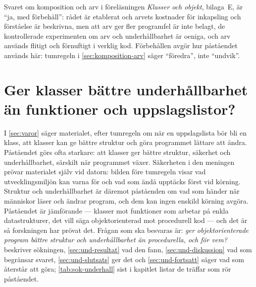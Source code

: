 Svaret om komposition och arv i föreläsningen \emph{Klasser och
objekt}, bilaga~E, är \enquote{ja, med förbehåll}: rådet är etablerat
och arvets kostnader för inkapsling och förståelse är beskrivna, men
att arv ger fler programfel är inte belagt, de kontrollerade
experimenten om arv och underhållbarhet är oeniga, och arv används
flitigt och
förnuftigt i verklig kod.  Förbehållen avgör hur påståendet används
här: tumregeln i \cref{sec:komposition-arv} säger \enquote{föredra},
inte \enquote{undvik}.

\begingroup
\ifdefined\marginnotebesidefloats{}\fi
\marginheightadjustment=48pt
\renewcommand{\foottextfont}{\scriptsize\mpjustification}
\chapter{Ger klasser bättre underhållbarhet än funktioner och uppslagslistor?}
\label{app:underhall}

I \cref{sec:varor} säger materialet, efter tumregeln om när en
uppslagslista bör bli en klass, att klasser kan ge bättre struktur och
göra programmet lättare att ändra.  Påståendet görs ofta starkare: att
klasser ger bättre struktur, säkerhet och underhållbarhet, särskilt när
programmet växer.  Säkerheten i den meningen prövar materialet själv
vid datorn: bilden före tumregeln visar vad utvecklingsmiljön kan varna
för och vad som ändå upptäcks först vid körning.  Struktur och
underhållbarhet är
däremot påståenden om vad som händer när människor läser och ändrar
program, och dem kan ingen enskild körning avgöra.  Påståendet är
jämförande --- klasser mot funktioner som arbetar på enkla
datastrukturer, det vill säga objektorienterad mot procedurell kod ---
och det är så forskningen har prövat det.  Frågan som ska besvaras är:
\emph{ger objektorienterade program bättre struktur och underhållbarhet
än procedurella, och för vem?}   beskriver
sökningen, \cref{sec:und-resultat} vad den fann,
\cref{sec:und-diskussion} vad som begränsar svaret,
\cref{sec:und-slutsats} ger det och \cref{sec:und-fortsatt} säger vad
som återstår att göra; \cref{tab:sok-underhall} sist i kapitlet listar
de träffar som rör påståendet.

